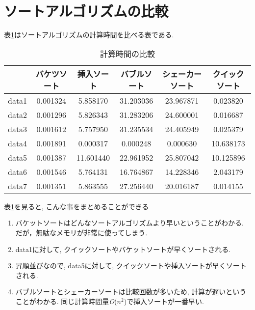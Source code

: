 \documentclass[a4j, titlepage]{jarticle}
\begin{document}
\section{ソートアルゴリズムの比較}
表\ref{table:hikaku}はソートアルゴリズムの計算時間を比べる表である.

\begin{table}[bth]
\label{table:hikaku}
\caption{計算時間の比較}
\begin{center}
\begin{tabular}{|l|c|c|c|c|c|}
\hline
      & バケツソート & 挿入ソート & バブルソート & シェーカーソート & クイックソート \\\hline
data1 & 0.001324 &  5.858170 & 31.203036 & 23.967871 &  0.023820 \\ \hline
data2 & \cellcolor{green!20}0.001296 &  5.826343 & \cellcolor{red!20}31.283206 & 24.600001 &  \cellcolor{green!20}0.016687 \\ \hline
data3 & 0.001612 &  5.757950 & 31.235534 & 24.405949 &  0.025379 \\ \hline
data4 & \cellcolor{red!20}0.001891 &  \cellcolor{green!20}0.000317 &  \cellcolor{green!20}0.000248 &  \cellcolor{green!20}0.000630 & \cellcolor{red!20}10.638173 \\ \hline
data5 & 0.001387 & \cellcolor{red!20}11.601440 & 22.961952 & \cellcolor{red!20}25.807042 & 10.125896 \\ \hline
data6 & 0.001546 &  5.764131 & 16.764867 & 14.228346 &  2.043179 \\ \hline
data7 & 0.001351 &  5.863555 & 27.256440 & 20.016187 &  0.014155 \\ \hline
\end{tabular}
\end{center}
\end{table} 

表\ref{table:hikaku}を見ると, こんな事をまとめることができる
\begin{enumerate}
\item バケットソートはどんなソートアルゴリズムより早いということがわかる. だが，無駄なメモリが非常に使ってしまう.
\item data1に対して, クイックソートやバケットソートが早くソートされる.
\item 昇順並びなので, data5に対して, クイックソートや挿入ソートが早くソートされる.
\item バブルソートとシェーカーソートは比較回数が多いため, 計算が遅いということがわかる. 同じ計算時間量\textit{O}($n^2$)で挿入ソートが一番早い.
\end{enumerate}
\pagebreak
\end{document}
